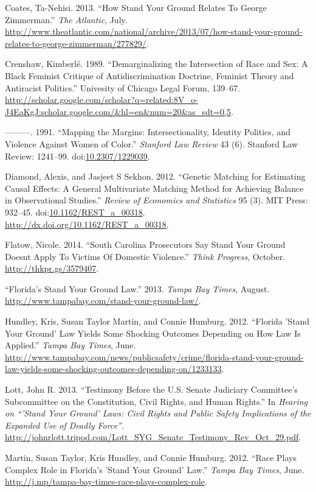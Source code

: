 \documentclass[12pt,article]{article}
\begin{document}
Coates, Ta-Nehisi. 2013. ``How Stand Your Ground Relates To George
Zimmerman.'' \emph{The Atlantic}, July.
\url{http://www.theatlantic.com/national/archive/2013/07/how-stand-your-ground-relates-to-george-zimmerman/277829/}.

Crenshaw, Kimberl{é}. 1989. ``Demarginalizing the Intersection of Race
and Sex: A Black Feminist Critique of Antidiscrimination Doctrine,
Feminist Theory and Antiracist Politics.'' Univesity of Chicago Legal
Forum, 139--67.
\url{http://scholar.google.com/scholar?q=related:8V_o-J4EaKgJ:scholar.google.com/\&hl=en\&num=20\&as_sdt=0,5}.

---------. 1991. ``Mapping the Margins: Intersectionality, Identity
Politics, and Violence Against Women of Color.'' \emph{Stanford Law
Review} 43 (6). Stanford Law Review: 1241--99.
doi:\href{http://dx.doi.org/10.2307/1229039}{10.2307/1229039}.

Diamond, Alexis, and Jasjeet S Sekhon. 2012. ``Genetic Matching for
Estimating Causal Effects: A General Multivariate Matching Method for
Achieving Balance in Observational Studies.'' \emph{Review of Economics
and Statistics} 95 (3). MIT Press: 932--45.
doi:\href{http://dx.doi.org/10.1162/REST_a_00318}{10.1162/REST\_a\_00318}.
\url{http://dx.doi.org/10.1162/REST_a_00318}.

Flatow, Nicole. 2014. ``South Carolina Prosecutors Say Stand Your Ground
Doesnt Apply To Victims Of Domestic Violence.'' \emph{Think Progress},
October. \url{http://thkpr.gs/3579407}.

``Florida's Stand Your Ground Law.'' 2013. \emph{Tampa Bay Times},
August. \url{http://www.tampabay.com/stand-your-ground-law/}.

Hundley, Kris, Susan Taylor Martin, and Connie Humburg. 2012. ``Florida
'Stand Your Ground' Law Yields Some Shocking Outcomes Depending on How
Law Is Applied.'' \emph{Tampa Bay Times}, June.
\url{http://www.tampabay.com/news/publicsafety/crime/florida-stand-your-ground-law-yields-some-shocking-outcomes-depending-on/1233133}.

Lott, John R. 2013. ``Testimony Before the U.S. Senate Judiciary
Committee's Subcommittee on the Constitution, Civil Rights, and Human
Rights.'' In \emph{Hearing on ``'Stand Your Ground' Laws: Civil Rights
and Public Safety Implications of the Expanded Use of Deadly Force''}.
\url{http://johnrlott.tripod.com/Lott_SYG_Senate_Testimony_Rev_Oct_29.pdf}.

Martin, Susan Taylor, Kris Hundley, and Connie Humburg. 2012. ``Race
Plays Complex Role in Florida's 'Stand Your Ground' Law.'' \emph{Tampa
Bay Times}, June.
\url{http://j.mp/tampa-bay-times-race-plays-complex-role}.
\end{document}

